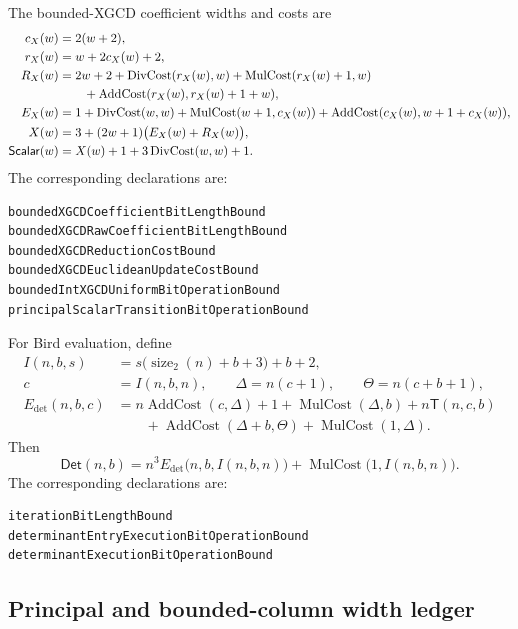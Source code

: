\documentclass[11pt]{article}
\theoremstyle{definition}
\newcommand{\natsize}{\operatorname{size}_2}
\newcommand{\AddCost}{\operatorname{AddCost}}
\newcommand{\MulCost}{\operatorname{MulCost}}
\newcommand{\DivCost}{\operatorname{DivCost}}
\begin{document}
The bounded-XGCD coefficient widths and costs are
\begin{align}
 c_X(w)&=2(w+2),\\
 r_X(w)&=w+2c_X(w)+2,\\
 R_X(w)&=2w+2+\DivCost(r_X(w),w)
        +\MulCost(r_X(w)+1,w)\notag\\
 &\qquad+\AddCost(r_X(w),r_X(w)+1+w),\\
 E_X(w)&=1+\DivCost(w,w)+\MulCost(w+1,c_X(w))
       +\AddCost(c_X(w),w+1+c_X(w)),\\
 X(w)&=3+(2w+1)\bigl(E_X(w)+R_X(w)\bigr),\\
 \mathsf{Scalar}(w)&=X(w)+1+3\DivCost(w,w)+1.
 \label{eq:scalarapp}
\end{align}
The corresponding declarations are:
\begin{lstlisting}[basicstyle=\ttfamily\footnotesize]
boundedXGCDCoefficientBitLengthBound
boundedXGCDRawCoefficientBitLengthBound
boundedXGCDReductionCostBound
boundedXGCDEuclideanUpdateCostBound
boundedIntXGCDUniformBitOperationBound
principalScalarTransitionBitOperationBound
\end{lstlisting}

For Bird evaluation, define
\begin{align*}
 I(n,b,s)&=s\bigl(\natsize(n)+b+3\bigr)+b+2,\\
 c&=I(n,b,n),\qquad
 \Delta=n(c+1),\qquad
 \Theta=n(c+b+1),\\
 E_{\det}(n,b,c)&=
   n\AddCost(c,\Delta)+1+\MulCost(\Delta,b)
   +n\mathsf T(n,c,b)\\
 &\qquad+\AddCost(\Delta+b,\Theta)+\MulCost(1,\Delta).
\end{align*}
Then
\begin{equation}
 \mathsf{Det}(n,b)=n^3E_{\det}\bigl(n,b,I(n,b,n)\bigr)
                  +\MulCost\bigl(1,I(n,b,n)\bigr).
 \label{eq:detexecapp}
\end{equation}
The corresponding declarations are:
\begin{lstlisting}[basicstyle=\ttfamily\footnotesize]
iterationBitLengthBound
determinantEntryExecutionBitOperationBound
determinantExecutionBitOperationBound
\end{lstlisting}

\subsection{Principal and bounded-column width ledger}
\end{document}
